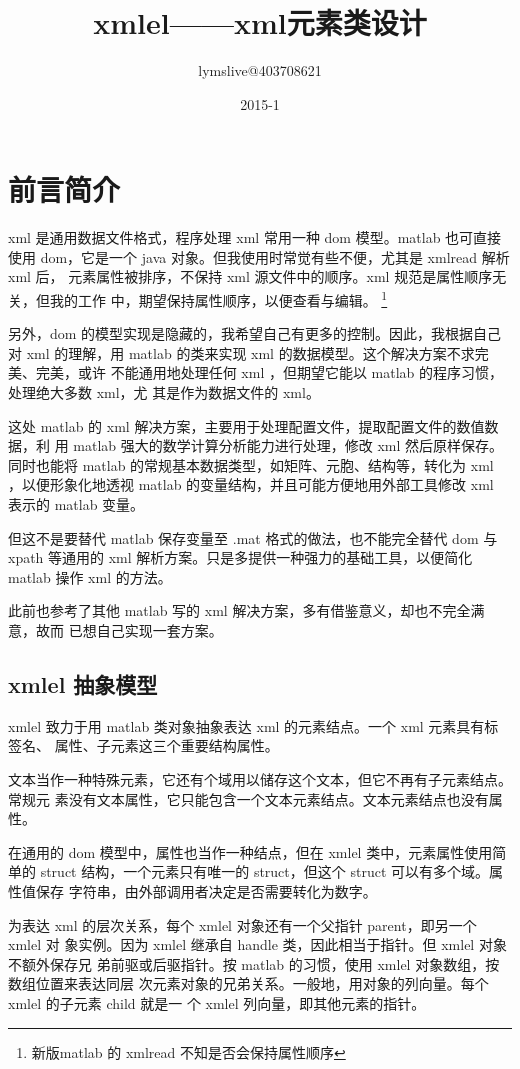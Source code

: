 

\title{xmlel——xml元素类设计}
\author{lymslive@403708621}
\date{2015-1}

\section{前言简介}

xml 是通用数据文件格式，程序处理 xml 常用一种 dom 模型。matlab 也可直接使用
dom，它是一个 java 对象。但我使用时常觉有些不便，尤其是 xmlread 解析 xml 后，
元素属性被排序，不保持 xml 源文件中的顺序。xml 规范是属性顺序无关，但我的工作
中，期望保持属性顺序，以便查看与编辑。
\footnote{新版matlab 的 xmlread 不知是否会保持属性顺序}

另外，dom 的模型实现是隐藏的，我希望自己有更多的控制。因此，我根据自己对 xml
的理解，用 matlab 的类来实现 xml 的数据模型。这个解决方案不求完美、完美，或许
不能通用地处理任何 xml ，但期望它能以 matlab 的程序习惯，处理绝大多数 xml，尤
其是作为数据文件的 xml。

这处 matlab 的 xml 解决方案，主要用于处理配置文件，提取配置文件的数值数据，利
用 matlab 强大的数学计算分析能力进行处理，修改 xml 然后原样保存。同时也能将
matlab 的常规基本数据类型，如矩阵、元胞、结构等，转化为 xml ，以便形象化地透视
matlab 的变量结构，并且可能方便地用外部工具修改 xml 表示的 matlab 变量。

但这不是要替代 matlab 保存变量至 .mat 格式的做法，也不能完全替代 dom 与 xpath
等通用的 xml 解析方案。只是多提供一种强力的基础工具，以便简化 matlab 操作 xml
的方法。

此前也参考了其他 matlab 写的 xml 解决方案，多有借鉴意义，却也不完全满意，故而
已想自己实现一套方案。

\subsection{xmlel 抽象模型}

xmlel 致力于用 matlab 类对象抽象表达 xml 的元素结点。一个 xml 元素具有标签名、
属性、子元素这三个重要结构属性。

文本当作一种特殊元素，它还有个域用以储存这个文本，但它不再有子元素结点。常规元
素没有文本属性，它只能包含一个文本元素结点。文本元素结点也没有属性。

在通用的 dom 模型中，属性也当作一种结点，但在 xmlel 类中，元素属性使用简单的
struct 结构，一个元素只有唯一的 struct，但这个 struct 可以有多个域。属性值保存
字符串，由外部调用者决定是否需要转化为数字。

为表达 xml 的层次关系，每个 xmlel 对象还有一个父指针 parent，即另一个 xmlel 对
象实例。因为 xmlel 继承自 handle 类，因此相当于指针。但 xmlel 对象不额外保存兄
弟前驱或后驱指针。按 matlab 的习惯，使用 xmlel 对象数组，按数组位置来表达同层
次元素对象的兄弟关系。一般地，用对象的列向量。每个 xmlel 的子元素 child 就是一
个 xmlel 列向量，即其他元素的指针。


